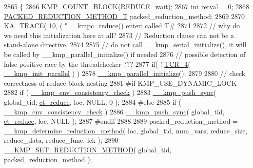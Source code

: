 \begin{DoxyCode}
2865 \{
2866     \hyperlink{group__STATS__GATHERING_ga7fa64ec62947bf0b97f3f4778dd22196}{KMP\_COUNT\_BLOCK}(REDUCE\_wait);
2867     \textcolor{keywordtype}{int} retval = 0;
2868     \hyperlink{kmp_8h_a79cdcd03cc0f2498719630411d56ef84}{PACKED\_REDUCTION\_METHOD\_T} packed\_reduction\_method;
2869 
2870     \hyperlink{kmp__debug_8h_a21d51f37cb197aca5ffe737531678830}{KA\_TRACE}( 10, ( \textcolor{stringliteral}{"\_\_kmpc\_reduce() enter: called T#%
2871 
2872     \textcolor{comment}{// why do we need this initialization here at all?}
2873     \textcolor{comment}{// Reduction clause can not be a stand-alone directive.}
2874 
2875     \textcolor{comment}{// do not call \_\_kmp\_serial\_initialize(), it will be called by \_\_kmp\_parallel\_initialize() if needed}
2876     \textcolor{comment}{// possible detection of false-positive race by the threadchecker ???}
2877     \textcolor{keywordflow}{if}( ! \hyperlink{kmp__os_8h_acd6256e4afba32d90997235fc0a38a74}{TCR\_4}( \hyperlink{kmp_8h_aa23ece0d05f38387c8a8441aaad368df}{\_\_kmp\_init\_parallel} ) )
2878         \hyperlink{kmp_8h_a9c18846c648d84276b9dd5a1d650ab04}{\_\_kmp\_parallel\_initialize}();
2879 
2880     \textcolor{comment}{// check correctness of reduce block nesting}
2881 \textcolor{preprocessor}{#if KMP\_USE\_DYNAMIC\_LOCK}
2882 \textcolor{preprocessor}{}    \textcolor{keywordflow}{if} ( \hyperlink{kmp_8h_ab4062d4f566c901230e51490a8819ba0}{\_\_kmp\_env\_consistency\_check} )
2883         \hyperlink{kmp__error_8c_a17886697972a1ad707cb5797332a7229}{\_\_kmp\_push\_sync}( global\_tid, \hyperlink{kmp_8h_a1582e7ddc609220a660d10244ef3e315a69ad53348e0bb90d6e3adee6345553ca}{ct\_reduce}, loc, NULL, 0 );
2884 \textcolor{preprocessor}{#else}
2885 \textcolor{preprocessor}{}    \textcolor{keywordflow}{if} ( \hyperlink{kmp_8h_ab4062d4f566c901230e51490a8819ba0}{\_\_kmp\_env\_consistency\_check} )
2886         \hyperlink{kmp__error_8c_a17886697972a1ad707cb5797332a7229}{\_\_kmp\_push\_sync}( global\_tid, \hyperlink{kmp_8h_a1582e7ddc609220a660d10244ef3e315a69ad53348e0bb90d6e3adee6345553ca}{ct\_reduce}, loc, NULL );
2887 \textcolor{preprocessor}{#endif}
2888 \textcolor{preprocessor}{}
2889     packed\_reduction\_method = \hyperlink{kmp_8h_a7735d7d58a02a05dbfebda565f97c80c}{\_\_kmp\_determine\_reduction\_method}( loc, 
      global\_tid, num\_vars, reduce\_size, reduce\_data, reduce\_func, lck );
2890     \hyperlink{kmp__csupport_8c_a7a13f1fc7eb548d763de215bd7cdcf51}{\_\_KMP\_SET\_REDUCTION\_METHOD}( global\_tid, packed\_reduction\_method );
}
\end{DoxyCode}
